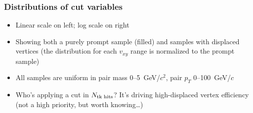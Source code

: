 \documentclass[compress]{beamer}
\newcommand{\s}[1]{{\mbox{\scriptsize #1}}}
\begin{document}
\begin{frame}
\frametitle{Distributions of cut variables}

\begin{itemize}
\item Linear scale on left; log scale on right
\item Showing both a purely prompt sample (filled) and samples with displaced vertices (the distribution for each $v_{xy}$ range is normalized to the prompt sample)
\item All samples are uniform in pair mass 0--5~GeV/$c^2$, pair $p_T$ 0--100~GeV/$c$
\item<3> Who's applying a cut in $N_\s{tk hits}$?  It's driving high-displaced vertex efficiency (not a high priority, but worth knowing\ldots)
\end{itemize}


\end{frame}
\end{document}
